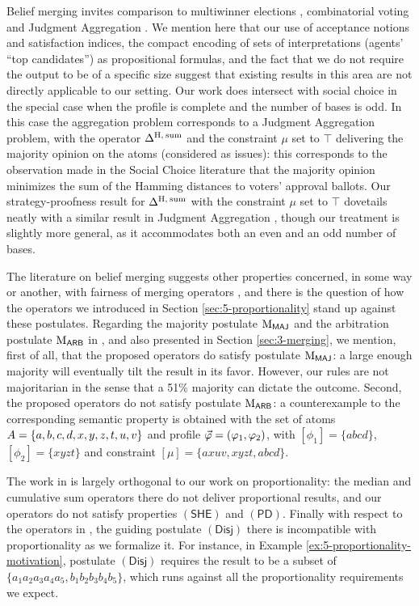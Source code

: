 Belief merging invites comparison to multiwinner elections \cite{FaliszewskiSST17}, 
combinatorial voting \cite{LangX16} and Judgment Aggregation \cite{Endriss16,Baumeister17}.
We mention here that our use of acceptance notions and satisfaction indices, 
the compact encoding of sets of interpretations (agents' ``top candidates'') as propositional formulas, 
and the fact that we do not require the output to be of a specific size
suggest that existing results in this area are not directly applicable to our setting. 
Our work does intersect with social choice in the special
case when the profile is complete
and the number of bases is odd.
In this case the aggregation problem corresponds
to a Judgment Aggregation problem, with the operator
$\me^{\hamming,\:\ssum}$ and the constraint $\mu$ set to $\top$
delivering the majority opinion on the atoms (considered as issues):
this corresponds to the observation made in the Social Choice literature \cite{Brams07} 
that the majority opinion minimizes the sum of 
the Hamming distances to voters' approval ballots.
Our strategy-proofness result for $\me^{\hamming,\:\ssum}$ 
with the constraint $\mu$ set to $\top$
dovetails neatly with a similar result in 
Judgment Aggregation \cite{Baumeister17,Endriss16},
though our treatment is slightly more general, as it accommodates
both an even and an odd number of bases.

The literature on belief merging suggests 
other properties concerned, in some way or another,
with fairness of merging operators \cite{KoniecznyP02,EveraereKM10b,EveraereKM14},
and there is the question of how the operators we introduced in Section \ref{sec:5-proportionality}
stand up against these postulates. 
Regarding the majority postulate $\ppm{\MAJ}$ 
and the arbitration postulate $\ppm{\ARB}$ in 
\cite{KoniecznyP11},
and also presented in Section \ref{sec:3-merging},
we mention, first of all, that the proposed operators do satisfy postulate $\ppm{\MAJ}$: 
a large enough majority will eventually tilt the result in its favor. 
However, our rules are not majoritarian in the sense that a 51\% majority can dictate the outcome.
Second, the proposed operators do not satisfy postulate $\ppm{\ARB}$: 
a counterexample to the corresponding semantic property is obtained with the 
set of atoms $\Atoms=\{a,b,c,d,x,y,z,t,u,v\}$ and
profile $\P=(\phi_1,\phi_2)$, with 
$[\phi_1]=\{abcd\}$, $[\phi_2]=\{xyzt\}$ and constraint $[\mu]=\{axuv,xyzt,abcd\}$.

The work in \cite{EveraereKM14} is largely orthogonal to our work on proportionality: 
the median and cumulative sum operators there do not deliver proportional results, 
and our operators do not satisfy properties $(\mathsf{SHE})$ and $(\mathsf{PD})$.
Finally with respect to the operators in \cite{EveraereKM10b}, 
the guiding postulate $(\mathsf{Disj})$ there is incompatible with proportionality 
as we formalize it. For instance, in Example \ref{ex:5-proportionality-motivation},
postulate $(\mathsf{Disj})$ requires the result to be a subset of 
$\{a_1a_2a_3a_4a_5,b_1b_2b_3b_4b_5\}$,
which runs against all the proportionality requirements we expect.

